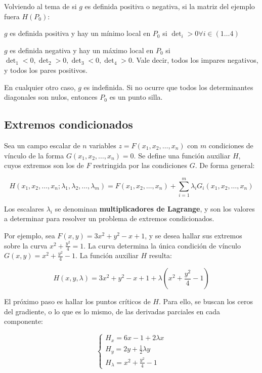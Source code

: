 \documentclass{article}
\begin{document}
Volviendo al tema de si $g$ es definida positiva o negativa, si la matriz del ejemplo fuera $H(P_0)$:

$g$ es definida positiva y hay un mínimo local en $P_0$ si $\det_i > 0 \forall i \in (1 \ldots 4)$

$g$ es definida negativa y hay un máximo local en $P_0$ si $\det_1 < 0, \det_2 > 0, \det_3 < 0, \det_4 > 0$. Vale decir, todos los impares negativos, y todos los pares positivos.

En cualquier otro caso, $g$ es indefinida. Si no ocurre que todos los determinantes diagonales son nulos, entonces $P_0$ es un punto silla.

\subsection{Extremos condicionados}

Sea un campo escalar de $n$ variables $z = F(x_1, x_2, \ldots, x_n)$ con $m$ condiciones de vínculo de la forma $G(x_1, x_2, \ldots, x_n) = 0$. Se define una función auxiliar $H$, cuyos extremos son los de $F$ restringida por las condiciones $G$. De forma general:

\begin{equation}
H(x_1, x_2, \ldots, x_n; \lambda_1, \lambda_2, \ldots, \lambda_m) = F(x_1, x_2, \ldots, x_n) + \sum\limits_{i=1}^m \lambda_i G_i(x_1, x_2, \ldots, x_n) 
\end{equation}

Los escalares $\lambda_i$ se denominan \textbf{multiplicadores de Lagrange}, y son los valores a determinar para resolver un problema de extremos condicionados.

Por ejemplo, sea $F(x,y) = 3 x^2 + y^2 - x + 1$, y se desea hallar sus extremos sobre la curva $x^2 + \frac{y^2}{4} = 1$. La curva determina la única condición de vínculo $G(x,y) = x^2 + \frac{y^2}{4} - 1$. La función auxiliar $H$ resulta:

\begin{equation}
H(x, y, \lambda) = 3 x^2 + y^2 - x + 1 + \lambda \left( x^2 + \frac{y^2}{4} - 1 \right)
\end{equation}

El próximo paso es hallar los puntos críticos de $H$. Para ello, se buscan los ceros del gradiente, o lo que es lo mismo, de las derivadas parciales en cada componente:

\begin{equation}
\left\{
\begin{array}{ll}
H_x = 6 x - 1 + 2 \lambda x \\
H_y = 2 y + \frac{1}{2} \lambda y \\
H_{\lambda} = x^2 + \frac{y^2}{4} - 1
\end{array}
\right.
\end{equation}
\end{document}
